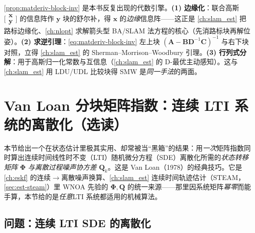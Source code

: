 \begin{insight}
\cref{prop:matderiv-block-inv} 是本书反复出现的代数引擎。\textbf{(1) 边缘化}：联合高斯 $\big[\begin{smallmatrix}\mathbf{x}\\\mathbf{y}\end{smallmatrix}\big]$ 的信息阵作 $\mathbf{y}$ 块的舒尔补，得 $\mathbf{x}$ 的\emph{边缘}信息阵——这正是 \cref{ch:slam_est} 把路标边缘化、\cref{ch:nlopt} 求解箭头型 BA/SLAM 法方程的核心（先消路标块再解位姿）。\textbf{(2) 求逆引理}：\cref{eq:matderiv-block-inv} 左上块 $(\mathbf{A}-\mathbf{B}\mathbf{D}^{-1}\mathbf{C})^{-1}$ 与右下块对照，立得 \cref{ch:slam_est} 的 Sherman--Morrison--Woodbury 引理。\textbf{(3) 行列式分解}：用于高斯归一化常数与互信息（\cref{ch:slam_est} 的 D-最优主动感知）。这与 \cref{ch:slam_est} 用 LDU/UDL 比较块得 SMW 是\emph{同一手法}的两面。
\end{insight}

\section{Van Loan 分块矩阵指数：连续 LTI 系统的离散化（选读）}
\label{sec:matderiv-vanloan}

本节给出一个在状态估计里极其实用、却常被当“黑箱”的结果：用\emph{一次}矩阵指数同时算出连续时间线性时不变（LTI）随机微分方程（SDE）离散化所需的\emph{状态转移矩阵} $\boldsymbol{\Phi}$ \emph{与}\emph{离散过程噪声协方差} $\mathbf{Q}_k$。这是 Van Loan（1978）的经典技巧\cite{vanloan1978computing}。它是 \cref{ch:eskf} 的连续$\to$离散噪声换算、\cref{ch:slam_est} 连续时间轨迹估计（STEAM，\cref{sec:est-steam}）里 WNOA 先验的 $\boldsymbol{\Phi},\mathbf{Q}$ 的统一来源——那里因系统矩阵\emph{幂零}而能手算，本节给的是\emph{任意}LTI 系统都适用的机械算法。

\subsection{问题：连续 LTI SDE 的离散化}
\label{sec:matderiv-vanloan-setup}

